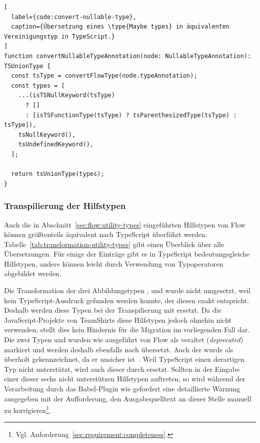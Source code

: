 \begin{lstlisting}[
  label={code:convert-nullable-type},
  caption={Übersetzung eines \type{Maybe types} in äquivalenten Vereinigungstyp in TypeScript.}
]
function convertNullableTypeAnnotation(node: NullableTypeAnnotation): TSUnionType {
  const tsType = convertFlowType(node.typeAnnotation);
  const types = [
    ...(isTSNullKeyword(tsType)
      ? []
      : [isTSFunctionType(tsType) ? tsParenthesizedType(tsType) : tsType]),
    tsNullKeyword(),
    tsUndefinedKeyword(),
  ];

  return tsUnionType(types);
}
\end{lstlisting}

\subsubsection{Transpilierung der Hilfstypen}

Auch die in Abschnitt~\ref{sec:flow:utility-types} eingeführten Hilfstypen von Flow können größtenteils äquivalent nach TypeScript überführt werden. Tabelle~\ref{tab:transformation-utility-types} gibt einen Überblick über alle Übersetzungen. Für einige der Einträge gibt es in TypeScript bedeutungsgleiche Hilfstypen, andere können leicht durch Verwendung von Typoperatoren abgebildet werden.

\tablespace


Die Transformation der drei Abbildungstypen ,  und  wurde nicht umgesetzt, weil kein TypeScript-Ausdruck gefunden werden konnte, der diesen exakt entspricht. Deshalb werden diese Typen bei der Transpilierung mit  ersetzt. Da die JavaScript-Projekte von TeamShirts diese Hilfstypen jedoch ohnehin nicht verwenden, stellt dies kein Hindernis für die Migration im vorliegenden Fall dar. Die zwei Typen  und  wurden wie ausgeführt von Flow als veraltet (\textit{deprecated}) markiert und werden deshalb ebenfalls nach  übersetzt. Auch der  wurde als überholt gekennzeichnet, da er unsicher ist~\autocite{FLOW:LINT_RULE_REFERENCE}. Weil TypeScript einen derartigen Typ nicht unterstützt, wird auch dieser durch  ersetzt. Sollten in der Eingabe einer dieser sechs nicht unterstützen Hilfstypen auftreten, so wird während der Verarbeitung durch das Babel-Plugin wie gefordert eine detaillierte Warnung ausgegeben mit der Aufforderung, den Ausgabequelltext an dieser Stelle manuell zu korrigieren\footnote{Vgl. Anforderung~\ref{sec:requirement:completeness}.}.

